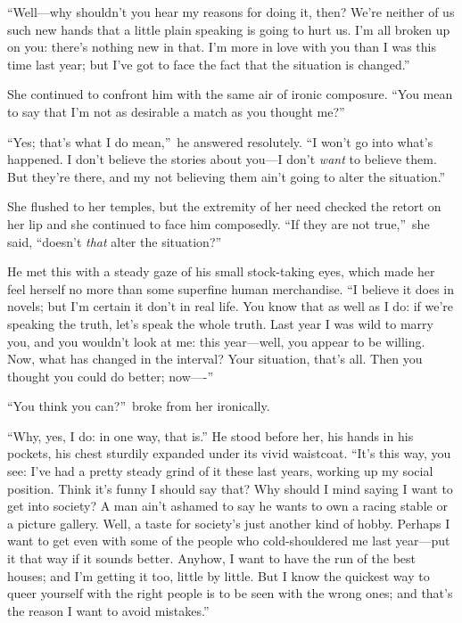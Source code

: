 \documentclass[12pt,a4paper]{book}
\begin{document}
``Well---why shouldn't you hear my reasons for doing it, then? 
We're neither of us such new hands that a little plain speaking
is going to hurt us. I'm all broken up on you: there's nothing
new in that. I'm more in love with you than I was this time last
year; but I've got to face the fact that the situation is
changed.''





She continued to confront him with the same air of ironic
composure. ``You mean to say that I'm not as desirable a match as
you thought me?''





``Yes; that's what I do mean,''\ he answered resolutely. ``I won't go
into what's happened. I don't believe the stories about you---I
don't \textit{want} to believe them. But they're there, and my not
believing them ain't going to alter the situation.''





She flushed to her temples, but the extremity of her need checked
the retort on her lip and she continued to face him composedly. 
``If they are not true,''\ she said, ``doesn't \textit{that} alter the
situation?''





He met this with a steady gaze of his small stock-taking eyes,
which made her feel herself no more than some superfine human
merchandise. ``I believe it does in novels; but I'm certain it
don't in real life. You know that as well as I do: if we're
speaking the truth, let's speak the whole truth. Last year I was
wild to marry you, and you wouldn't look at me: this year---well,
you appear to be willing. Now, what has changed in the interval? 
Your situation, that's all. Then you thought you could do better;
now----''





``You think you can?''\ broke from her ironically.





``Why, yes, I do: in one way, that is.'' He stood before her, his
hands in his pockets, his chest sturdily expanded under its vivid
waistcoat. ``It's this way, you see: I've had a pretty steady
grind of it these last years, working up my social position. 
Think it's funny I should say that? Why should I mind saying I
want to get into society? A man ain't ashamed to say he wants to
own a racing stable or a picture gallery. Well, a taste for
society's just another kind of hobby. Perhaps I want to get even
with some of the people who cold-shouldered me last year---put it
that way if it sounds better. Anyhow, I want to have the run of
the best houses; and I'm getting it too, little by little. But I
know the quickest way to queer yourself with the right
people is to be seen with the wrong ones; and that's the reason I
want to avoid mistakes.''
\end{document}
